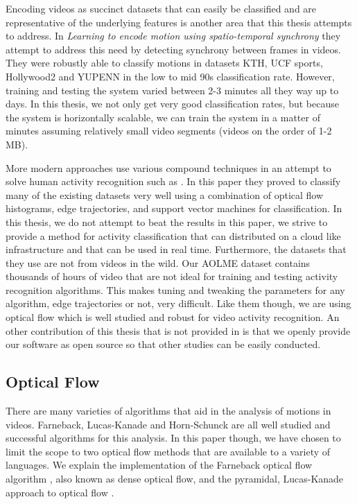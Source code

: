 Encoding videos as succinct datasets that can easily be classified and are
representative of the underlying features is another area that this thesis
attempts to address. In \textit{Learning to encode motion using spatio-temporal
synchrony} \cite{konda2013learning} they attempt to address this need by detecting
synchrony between frames in videos. They were robustly able to classify motions in
datasets KTH, UCF sports, Hollywood2 and YUPENN in the low to mid 90s classification
rate. However, training and testing the system varied between 2-3 minutes all
they way up to days. In this thesis, we not only get very good classification
rates, but because the system is horizontally scalable, we can train the system
in a matter of minutes assuming relatively small video segments (videos on the
order of 1-2 MB).

More modern approaches use various compound techniques in an attempt to solve
human activity recognition such as \cite{wang2016action}. In this paper they
proved to classify many of the existing datasets very well using a combination
of optical flow histograms, edge trajectories, and support vector machines  for
classification. In this thesis, we do not attempt to beat the results in this
paper, we strive to provide a method for activity classification that can
distributed on a cloud like infrastructure and that can be used in real time.
Furthermore, the datasets that they use are not from videos in the wild. Our
AOLME dataset contains thousands of hours of video that are not ideal for
training and testing activity recognition algorithms. This makes tuning and
tweaking the parameters for any algorithm, edge trajectories or not, very
difficult. Like them though, we are using optical flow which is well studied and
robust for video activity recognition. An other contribution of this thesis
that is not provided in \cite{wang2016action} is that we openly provide our software
as open source so that other studies can be easily conducted.



\subsection{\label{section:optical_flow}Optical Flow}
There are many varieties of algorithms that aid in the analysis of motions in
videos.  Farneback, Lucas-Kanade and Horn-Schunck \cite{horn1981determining} are
all well studied and successful algorithms for this analysis. In this paper
though, we have chosen to limit the scope to two optical flow methods that are
available to a variety of languages. We explain the implementation of the
Farneback optical flow algorithm \cite{farneback2003two}, also known as dense
optical flow, and the pyramidal, Lucas-Kanade approach to optical flow
\cite{bouguet2001pyramidal}.

